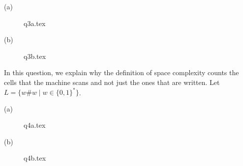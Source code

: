 \documentclass[12pt, a4paper,answers]{exam}
\begin{document}
\begin{questions}
\begin{solution}
    \begin{description}
        \item[(a)] {q3a.tex}
        \item[(b)] {q3b.tex}
    \end{description}
\end{solution}



In this question, we explain why the definition of space complexity counts the cells that the machine scans and not just the ones that are written. Let $L = \{w \#w \mid w \in \{0,1\}^*\}$.

\begin{solution}
    \begin{description}
        \item[(a)] {q4a.tex}
        \item[(b)] {q4b.tex}
    \end{description}
\end{solution}


\end{questions}
\end{document}
